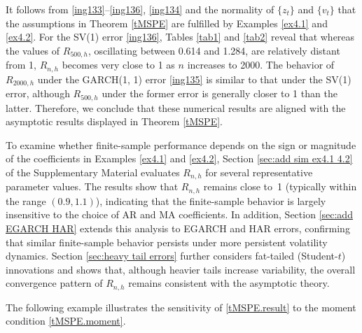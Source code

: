 \documentclass[ejsv2]{imsart}
\theoremstyle{plain}
\theoremstyle{definition}
\theoremstyle{remark}
\begin{document}
It follows from \eqref{ing133}--\eqref{ing136}, \eqref{ing134}
and the normality of $\{z_t\}$ and $\{v_t\}$
that the assumptions in Theorem \ref{tMSPE}
are fulfilled by Examples \ref{ex4.1} and \ref{ex4.2}.
For the SV(1) error \eqref{ing136},
Tables \ref{tab1} and \ref{tab2}
reveal that whereas
the values of $R_{500,h}$, oscillating
between 0.614 and 1.284, are relatively distant from 1,
$R_{n,h}$ becomes very close to 1 as $n$ increases to 2000.
The behavior of $R_{2000,h}$ under the GARCH(1, 1) error \eqref{ing135}
is similar to that under the SV(1) error, although
$R_{500, h}$ under the former error is generally closer to 1 than the latter.
Therefore, we conclude that these numerical
results are aligned with
the asymptotic results displayed
in Theorem \ref{tMSPE}.


To examine whether finite-sample performance depends on the sign or
magnitude of the coefficients in Examples
\ref{ex4.1} and \ref{ex4.2}, Section
\ref{sec:add sim ex4.1 4.2}
of
the Supplementary Material evaluates $R_{n,h}$ for several representative
parameter values. The results show that $R_{n,h}$ remains close to~1
(typically within the range $(0.9,1.1)$), indicating that the finite-sample
behavior is largely insensitive to the choice of AR and MA coefficients.
In addition, Section
\ref{sec:add EGARCH HAR} extends this analysis to EGARCH and HAR errors, confirming that similar finite-sample behavior persists under more
persistent volatility dynamics. Section
\ref{sec:heavy tail errors}
further considers fat-tailed
(Student-$t$) innovations and shows that, although heavier tails increase
variability, the overall convergence pattern of $R_{n,h}$ remains
consistent with the asymptotic theory.
 
The following example illustrates the sensitivity of \eqref{tMSPE.result} to the moment condition \eqref{tMSPE.moment}.
\end{document}
